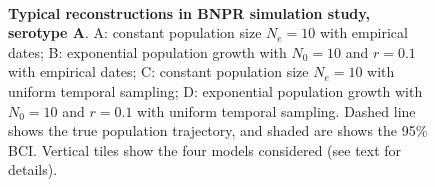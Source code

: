 \documentclass[a4paper,10pt]{article}
\begin{document}
\begin{center}
\begin{figure}[H]
\begin{center}
\\
\end{center}
\caption{\textbf{Typical reconstructions in BNPR simulation study, serotype A}.
A: constant population size $N_e = 10$ with empirical dates; B: exponential population growth with $N_0 = 10$ and $r = 0.1$ with empirical dates; C: constant population size $N_e = 10$ with uniform temporal sampling; D: exponential population growth with $N_0 = 10$ and $r = 0.1$ with uniform temporal sampling.
Dashed line shows the true population trajectory, and shaded are shows the 95\% BCI.
Vertical tiles show the four models considered (see text for details).
}
\label{sfig:reconplots_A}
\end{figure}
\end{center}
\newpage
\end{document}
